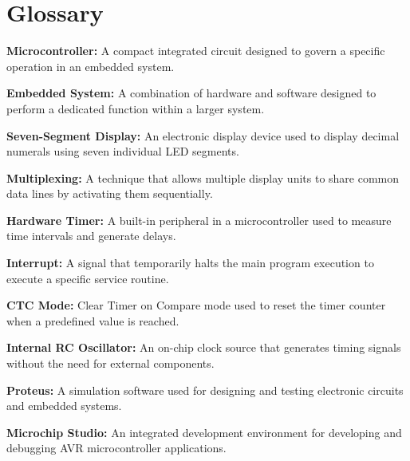 \chapter*{Glossary}

\textbf{Microcontroller:}  
A compact integrated circuit designed to govern a specific operation in an embedded system.

\textbf{Embedded System:}  
A combination of hardware and software designed to perform a dedicated function within a larger system.

\textbf{Seven-Segment Display:}  
An electronic display device used to display decimal numerals using seven individual LED segments.

\textbf{Multiplexing:}  
A technique that allows multiple display units to share common data lines by activating them sequentially.

\textbf{Hardware Timer:}  
A built-in peripheral in a microcontroller used to measure time intervals and generate delays.

\textbf{Interrupt:}  
A signal that temporarily halts the main program execution to execute a specific service routine.

\textbf{CTC Mode:}  
Clear Timer on Compare mode used to reset the timer counter when a predefined value is reached.

\textbf{Internal RC Oscillator:}  
An on-chip clock source that generates timing signals without the need for external components.

\textbf{Proteus:}  
A simulation software used for designing and testing electronic circuits and embedded systems.

\textbf{Microchip Studio:}  
An integrated development environment for developing and debugging AVR microcontroller applications.
